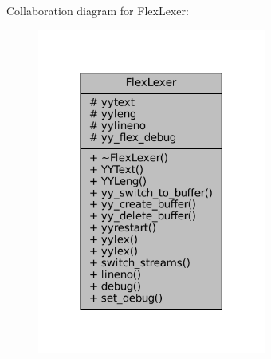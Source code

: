 Collaboration diagram for Flex\+Lexer\+:
\nopagebreak
\begin{figure}[H]
\begin{center}
\leavevmode
\includegraphics[width=213pt]{classFlexLexer__coll__graph}
\end{center}
\end{figure}
